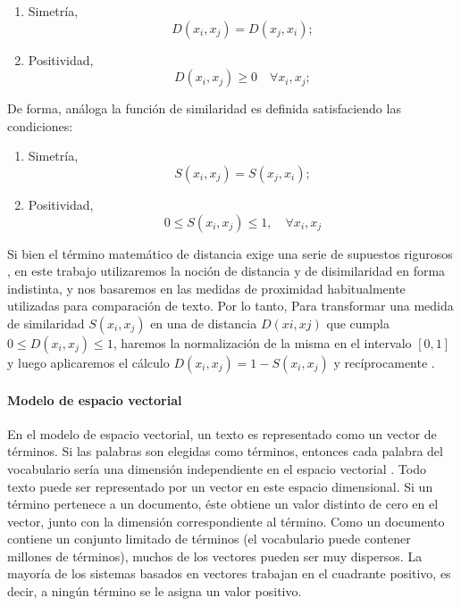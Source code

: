 \begin{enumerate}
	\item Simetría,
	\[D(x_i,x_j)=D(x_j,x_i);\]
	
	\item Positividad,
	\[D(x_i,x_j) \geq 0 \quad \forall x_i,x_j;\]
\end{enumerate}

De forma, análoga la función de similaridad es definida satisfaciendo las condiciones:
\begin{enumerate}
	\item Simetría,
	\[S(x_i,x_j)=S(x_j,x_i);\]
	
	\item Positividad,
	\[0 \leq S(x_i,x_j) \leq 1, \quad \forall x_i,x_j\]
\end{enumerate}

Si bien el término matemático de distancia exige una serie de supuestos rigurosos \citep{xu2008clustering}, en este trabajo utilizaremos la noción de distancia y de disimilaridad en forma indistinta, y nos basaremos en las medidas de proximidad habitualmente utilizadas para comparación de texto. Por lo tanto, Para transformar una medida de similaridad \(S(x_i,x_j)\) en una de distancia \(D(xi,xj)\) que cumpla \(0 \leq D(x_i,x_j) \leq 1\), haremos la normalización de la misma en el intervalo \([0,1]\) y luego aplicaremos el cálculo \(D(x_i,x_j) = 1 - S(x_i,x_j)\) y recíprocamente \citep{leale2013novel}.

\paragraph{Modelo de espacio vectorial}
En el modelo de espacio vectorial, un texto es representado como un vector de términos. Si las palabras son elegidas como términos, entonces cada palabra del vocabulario sería una dimensión independiente en el espacio vectorial \citep{singhal2001modern}. Todo texto puede ser representado por un vector en este espacio dimensional. Si un término pertenece a un documento, éste obtiene un valor distinto de cero en el vector, junto con la dimensión correspondiente al término. Como un documento contiene un conjunto limitado de términos (el vocabulario puede contener millones de términos), muchos de los vectores pueden ser muy dispersos. La mayoría de los sistemas basados en vectores trabajan en el cuadrante positivo, es decir, a ningún término se le asigna un valor positivo. 

